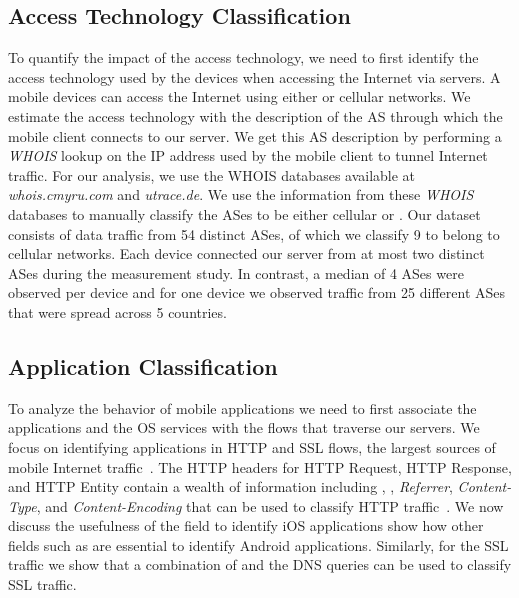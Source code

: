\subsection{Access Technology Classification}

To quantify the impact of the access technology, we need to first identify the access technology used by the devices when accessing the Internet via \platname servers.
A mobile devices can access the Internet using either \wifi or cellular networks. 
We estimate the access technology with the description of the AS through which the mobile client connects to our \platname server. 
We get this AS description by performing a \emph{WHOIS} lookup on the IP address used by the mobile client to tunnel Internet traffic. 
For our analysis, we use the WHOIS databases available at \emph{whois.cmyru.com} and \emph{utrace.de}.
We use the information from these \emph{WHOIS} databases to manually classify the ASes to be either cellular or \wifi.
Our dataset consists of data traffic from 54 distinct ASes, of which we classify 9 to belong to cellular networks.
Each device connected our \platname server from at most two distinct ASes during the measurement study.
In contrast, a median of 4 \wifi ASes were observed per device and for one device we observed traffic from 25 different \wifi ASes that were spread across 5 countries. 

\subsection{Application Classification}

To analyze the behavior of mobile applications we need to first associate the applications and the OS services with the flows that traverse our \platname servers.
We focus on identifying applications in HTTP and SSL flows, the largest sources of mobile Internet traffic~\cite{maier:mobtraffic,falaki:mobileusage,xu:appusage}.
The HTTP headers for HTTP Request, HTTP Response, and HTTP Entity contain a wealth of information including \useragent, \httphost, \emph{Referrer}, \emph{Content-Type}, and \emph{Content-Encoding} that can be used to classify HTTP traffic~\cite{rfc:http}.
We now discuss the usefulness of the \useragent field to identify iOS applications show how other fields such as \httphost are essential to identify Android applications. 
Similarly, for the SSL traffic we show that a combination of \sslservername and the DNS queries can be used to classify SSL traffic. 

